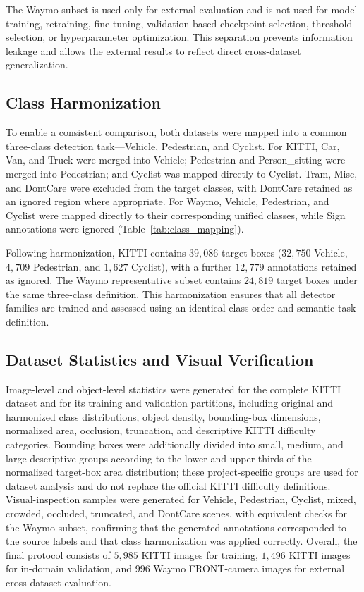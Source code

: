 The Waymo subset is used only for external evaluation and is not used for model training,
retraining, fine-tuning, validation-based checkpoint selection, threshold selection, or
hyperparameter optimization. This separation prevents information leakage and allows the
external results to reflect direct cross-dataset generalization.

\subsection{Class Harmonization}
\label{sec:datasets_harmonization}

To enable a consistent comparison, both datasets were mapped into a common three-class
detection task---Vehicle, Pedestrian, and Cyclist. For KITTI, Car, Van, and Truck were
merged into Vehicle; Pedestrian and Person\_sitting were merged into Pedestrian; and
Cyclist was mapped directly to Cyclist. Tram, Misc, and DontCare were excluded from the
target classes, with DontCare retained as an ignored region where appropriate. For Waymo,
Vehicle, Pedestrian, and Cyclist were mapped directly to their corresponding unified
classes, while Sign annotations were ignored (Table~\ref{tab:class_mapping}).

Following harmonization, KITTI contains $39{,}086$ target boxes ($32{,}750$ Vehicle,
$4{,}709$ Pedestrian, and $1{,}627$ Cyclist), with a further $12{,}779$ annotations
retained as ignored. The Waymo representative subset contains $24{,}819$ target boxes
under the same three-class definition. This harmonization ensures that all detector
families are trained and assessed using an identical class order and semantic task
definition.

\subsection{Dataset Statistics and Visual Verification}
\label{sec:datasets_verification}

Image-level and object-level statistics were generated for the complete KITTI dataset and
for its training and validation partitions, including original and harmonized class
distributions, object density, bounding-box dimensions, normalized area, occlusion,
truncation, and descriptive KITTI difficulty categories. Bounding boxes were additionally
divided into small, medium, and large descriptive groups according to the lower and upper
thirds of the normalized target-box area distribution; these project-specific groups are
used for dataset analysis and do not replace the official KITTI difficulty definitions.
Visual-inspection samples were generated for Vehicle, Pedestrian, Cyclist, mixed, crowded,
occluded, truncated, and DontCare scenes, with equivalent checks for the Waymo subset,
confirming that the generated annotations corresponded to the source labels and that class
harmonization was applied correctly. Overall, the final protocol consists of $5{,}985$
KITTI images for training, $1{,}496$ KITTI images for in-domain validation, and $996$
Waymo FRONT-camera images for external cross-dataset evaluation.
